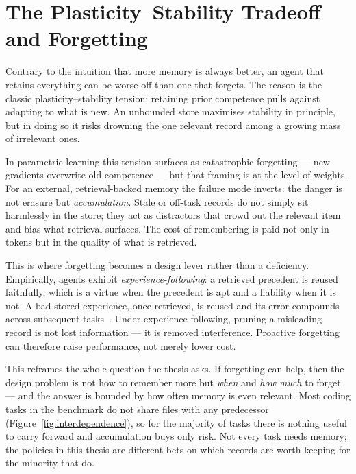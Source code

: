 

\section{The Plasticity--Stability Tradeoff and Forgetting}

Contrary to the intuition that more memory is always better, an agent that retains
everything can be worse off than one that forgets. The reason is the classic
plasticity--stability tension: retaining prior competence pulls against adapting to what is
new. An unbounded store maximises stability in principle, but in doing so it risks drowning
the one relevant record among a growing mass of irrelevant ones.

In parametric learning this tension surfaces as catastrophic forgetting --- new gradients
overwrite old competence --- but that framing is at the level of weights. For an external,
retrieval-backed memory the failure mode inverts: the danger is not erasure but
\emph{accumulation}. Stale or off-task records do not simply sit harmlessly in the store;
they act as distractors that crowd out the relevant item and bias what retrieval surfaces.
The cost of remembering is paid not only in tokens but in the quality of what is retrieved.

This is where forgetting becomes a design lever rather than a deficiency. Empirically,
agents exhibit \emph{experience-following}: a retrieved precedent is reused faithfully,
which is a virtue when the precedent is apt and a liability when it is not. A bad stored
experience, once retrieved, is reused and its error compounds across subsequent
tasks~\cite{xiong2025}. Under experience-following, pruning a misleading record is not lost
information --- it is removed interference. Proactive forgetting can therefore raise
performance, not merely lower cost.

This reframes the whole question the thesis asks. If forgetting can help, then the design
problem is not how to remember more but \emph{when} and \emph{how much} to forget --- and
the answer is bounded by how often memory is even relevant. Most coding tasks in the
benchmark do not share files with any predecessor (Figure~\ref{fig:interdependence}), so
for the majority of tasks there is nothing useful to carry forward and accumulation buys
only risk. Not every task needs memory; the policies in this thesis are different bets on
which records are worth keeping for the minority that do.
